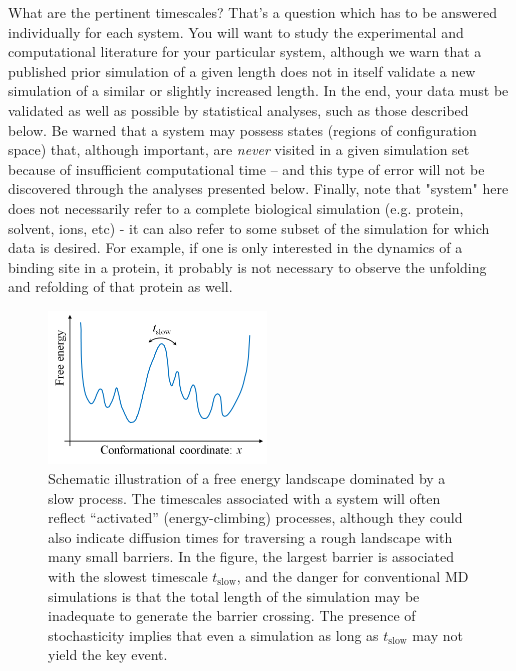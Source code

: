 What are the pertinent timescales?
That's a question which has to be answered individually for each system.
You will want to study the experimental and computational literature for your particular system, although we warn that a published prior simulation of a given length does not in itself validate a new simulation of a similar or slightly increased length.
In the end, your data must be validated as well as possible by statistical analyses, such as those described below. 
Be warned that a system may possess states (regions of configuration space) that, although important, are \emph{never} visited in a given simulation set because of insufficient computational time \cite{Grossfield2009} -- and this type of error will not be discovered through the analyses presented below.
Finally, note that "system" here does not necessarily refer to a complete biological simulation (e.g. protein, solvent, ions, etc) - it can also refer to some subset of the simulation for which data is desired. 
For example, if one is only interested in the dynamics of a binding site in a protein, it probably is not necessary to observe the unfolding and refolding of that protein as well.


\begin{figure}
  \centering
  \includegraphics[width=5.8cm]{figures/1d-landscape-tslow}
  \caption{
  \label{fig:landscape} 
  Schematic illustration of a free energy landscape dominated by a slow process.
  The timescales associated with a system will often reflect ``activated'' (energy-climbing) processes, although they could also indicate diffusion times for traversing a rough landscape with many small barriers.
  In the figure, the largest barrier is associated with the slowest timescale $t_{\mathrm{slow}}$, and the danger for conventional MD simulations is that the total length of the simulation may be inadequate to generate the barrier crossing.
  The presence of stochasticity implies that even a simulation as long as $t_{\mathrm{slow}}$ may not yield the key event.
  }
\end{figure}

